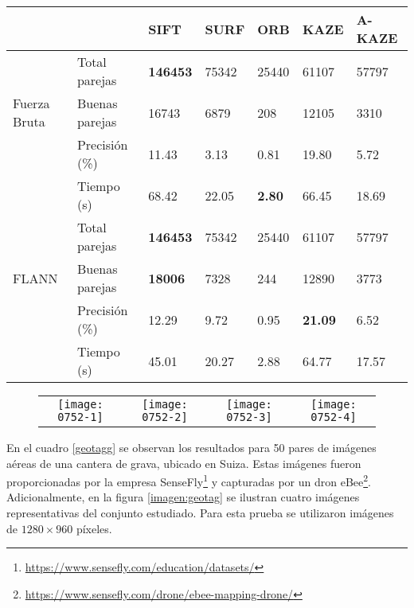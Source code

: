 \begin{table}[h]
	\centering
	\label{0752-2}
	\renewcommand{\arraystretch}{0.8}%
	\begin{tabular}{@{}lllllll@{}}
		\toprule
		&                      				& SIFT 			& SURF & ORB 		& KAZE 				& A-KAZE  \\ \midrule 
		\hfill\vline& Total parejas  &\textbf{146453}		& 75342&25440		&61107 				& 57797   \\
		Fuerza Bruta \vline& Buenas parejas & 16743			& 6879 & 208 		& 12105 			& 3310    \\
		\hfill\vline& Precisión (\%) & 11.43				&3.13  &0.81		& 19.80 			& 5.72  \\
		\vspace{0.3cm}
		\hfill\vline& Tiempo (s)     & 68.42				&22.05 & \textbf{2.80} &66.45       & 18.69   \\
		
		\hfill\vline& Total parejas  &\textbf{146453}& 75342&25440			&61107 				& 57797   \\
		FLANN  \hfill\vline& Buenas parejas &\textbf{18006} & 7328 & 244 			& 12890 			& 3773    \\
		\hfill\vline& Precisión (\%) & 12.29				& 9.72 &0.95  			& \textbf{21.09} 	& 6.52    \\ 
		\hfill\vline& Tiempo (s)     & 45.01				& 20.27& 2.88			& 64.77				& 17.57   \\ 
		\bottomrule
	\end{tabular}
\end{table}

\begin{figure}[h]
	\centering
	\vspace{0.6cm}
	\begin{tabular}{@{}cccc@{}}
		\texttt{[image: 0752-1]} &
		\texttt{[image: 0752-2]} &
		\texttt{[image: 0752-3]} &
		\texttt{[image: 0752-4]} 
	\end{tabular}
	\label{imagen:0752}
\end{figure}

En el cuadro \ref{geotagg} se observan los resultados para 50 pares de imágenes aéreas de una cantera de grava, ubicado en Suiza. Estas imágenes fueron proporcionadas por la empresa SenseFly\footnote{\url{https://www.sensefly.com/education/datasets/}} y capturadas por un dron eBee\footnote{\url{https://www.sensefly.com/drone/ebee-mapping-drone/}}.  Adicionalmente, en la figura \ref{imagen:geotag} se ilustran cuatro imágenes representativas del conjunto estudiado. Para esta prueba se utilizaron imágenes de $1280\times960$ píxeles.

